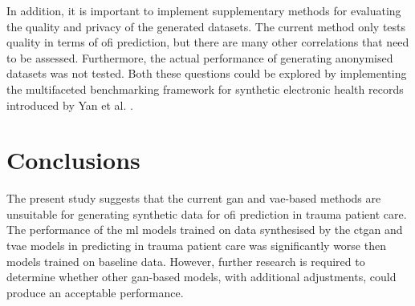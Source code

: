 \documentclass[12pt, a4paper]{article}
\begin{document}
In addition, it is important to implement supplementary methods for evaluating the quality and privacy of the generated datasets. The current method only tests quality in terms of \acrshort{ofi} prediction, but there are many other correlations that need to be assessed. Furthermore, the actual performance of generating anonymised datasets was not tested. Both these questions could be explored by implementing the multifaceted benchmarking framework for synthetic electronic health records introduced by Yan et al. \cite{yan_multifaceted_2022}.

\section{Conclusions}
The present study suggests that the current \acrshort{gan} and \acrshort{vae}-based methods are unsuitable for generating synthetic data for \acrshort{ofi} prediction in trauma patient care. The performance of the \acrshort{ml} models trained on data synthesised by the \acrshort{ctgan} and \acrshort{tvae} models in predicting  in trauma patient care was significantly worse then models trained on baseline data. However, further research is required to determine whether other \acrshort{gan}-based models, with additional adjustments, could produce an acceptable performance.

\newpage

\singlespacing

\printbibliography

\newpage
\end{document}
